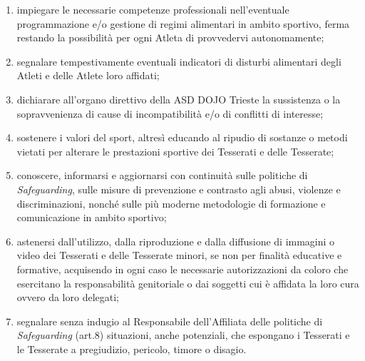 \documentclass{djtsasddoc}
\begin{document}
\begin{enumerate}
\begin{enumerate}
			\item impiegare le necessarie competenze professionali nell'eventuale programmazione e/o gestione 	di regimi alimentari in ambito sportivo, ferma restando la possibilità per ogni Atleta di	provvedervi autonomamente;
			\item segnalare tempestivamente eventuali indicatori di disturbi alimentari degli Atleti e delle Atlete loro affidati;
			\item dichiarare all'organo direttivo della ASD DOJO Trieste la sussistenza o la sopravvenienza di	cause di incompatibilità e/o di conflitti di interesse;
			\item sostenere i valori del sport, altresì educando al ripudio di sostanze o metodi vietati per alterare le prestazioni sportive dei Tesserati e delle Tesserate;
			\item conoscere, informarsi e aggiornarsi con continuità sulle politiche di \textit{Safeguarding}, sulle misure di prevenzione e contrasto agli abusi, violenze e discriminazioni, nonché sulle più moderne metodologie di formazione e comunicazione in ambito sportivo;
			\item astenersi dall'utilizzo, dalla riproduzione e dalla diffusione di immagini o video dei Tesserati e delle Tesserate minori, se non per finalità educative e formative, acquisendo in ogni caso le 	necessarie autorizzazioni da coloro che esercitano la responsabilità genitoriale o dai soggetti cui è affidata la loro cura ovvero da loro delegati;
			\item segnalare senza indugio al Responsabile dell'Affiliata delle politiche di \textit{Safeguarding} (art.8) situazioni, anche potenziali, che espongano i Tesserati e le Tesserate a pregiudizio, pericolo, timore o disagio.
		\end{enumerate}
	\end{enumerate}
	
\end{document}
